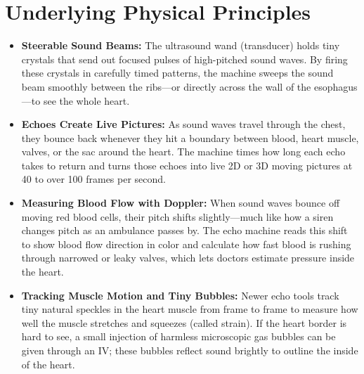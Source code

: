 \section{Underlying Physical Principles}
\begin{itemize}
\item \textbf{Steerable Sound Beams:} The ultrasound wand (transducer) holds tiny crystals that send out focused pulses of high-pitched sound waves. By firing these crystals in carefully timed patterns, the machine sweeps the sound beam smoothly between the ribs---or directly across the wall of the esophagus---to see the whole heart.
\item \textbf{Echoes Create Live Pictures:} As sound waves travel through the chest, they bounce back whenever they hit a boundary between blood, heart muscle, valves, or the sac around the heart. The machine times how long each echo takes to return and turns those echoes into live 2D or 3D moving pictures at 40 to over 100 frames per second.
\item \textbf{Measuring Blood Flow with Doppler:} When sound waves bounce off moving red blood cells, their pitch shifts slightly---much like how a siren changes pitch as an ambulance passes by. The echo machine reads this shift to show blood flow direction in color and calculate how fast blood is rushing through narrowed or leaky valves, which lets doctors estimate pressure inside the heart.
\item \textbf{Tracking Muscle Motion and Tiny Bubbles:} Newer echo tools track tiny natural speckles in the heart muscle from frame to frame to measure how well the muscle stretches and squeezes (called strain). If the heart border is hard to see, a small injection of harmless microscopic gas bubbles can be given through an IV; these bubbles reflect sound brightly to outline the inside of the heart.
\end{itemize}


